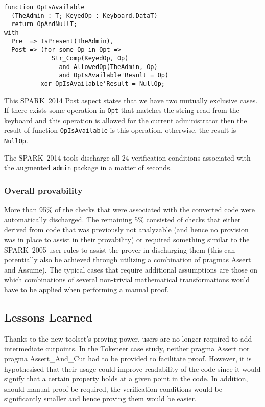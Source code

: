 \documentclass[10pt,a4paper,twocolumn]{article}
\newcommand{\oldspark}{SPARK~2005\xspace}
\newcommand{\newspark}{SPARK~2014\xspace}
\newcommand{\SPARK}[1]{\lstinline[language=Ada,basicstyle={\footnotesize
      \sffamily},framesep=0pt]$#1$}
\begin{document}
\begin{lstlisting}
function OpIsAvailable
  (TheAdmin : T; KeyedOp : Keyboard.DataT)
  return OpAndNullT;
with
  Pre  => IsPresent(TheAdmin),
  Post => (for some Op in Opt =>
             Str_Comp(KeyedOp, Op)
               and AllowedOp(TheAdmin, Op)
               and OpIsAvailable'Result = Op)
          xor OpIsAvailable'Result = NullOp;
\end{lstlisting}
This \newspark Post aspect states that we have two mutually
exclusive cases. If there exists some operation in \SPARK{Opt} that
matches the string read from the keyboard and this operation is
allowed for the current administrator then the result of function
\SPARK{OpIsAvailable} is this operation, otherwise, the result is
\SPARK{NullOp}.

The \newspark tools discharge all 24 verification conditions
associated with the augmented \SPARK{admin} package in a matter of
seconds.

\subsubsection{Overall provability}

More than 95\% of the checks that were associated with the converted
code were automatically discharged. The remaining 5\% consisted of
checks that either derived from code that was previously not
analyzable (and hence no provision was in place to assist in their
provability) or required something similar to the \oldspark user rules
to assist the prover in discharging them (this can potentially also be
achieved through utilizing a combination of pragmas Assert and
Assume). The typical cases that require additional assumptions are
those on which combinations of several non-trivial mathematical
transformations would have to be applied when performing a manual
proof.

\subsection{Lessons Learned}

Thanks to the new toolset's proving power, users are no longer
required to add intermediate cutpoints. In the Tokeneer case study,
neither pragma Assert nor pragma Assert\_And\_Cut had to be provided
to facilitate proof. However, it is hypothesised that their usage
could improve readability of the code since it would signify that a
certain property holds at a given point in the code. In addition,
should manual proof be required, the verification conditions would be
significantly smaller and hence proving them would be easier.
\end{document}
